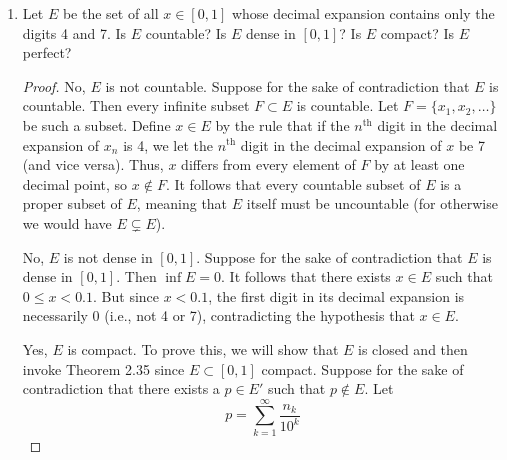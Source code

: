 \documentclass[../psets.tex]{subfiles}
\begin{document}
\begin{enumerate}[label={\textbf{\arabic*.}}]
\begin{proof}
        Define an open cover $\{G_p\}$ of $E$ by
        \begin{equation*}
            G_p = \left( \frac{2(p+1)}{p+2},\frac{3(p+1)}{p+3} \right)
        \end{equation*}
        for each $p\in E$. Clearly each $G_p$ is open as a segment and $p\in G_p$ for each $p\in E$, so $\{G_p\}$ is an open cover of $E$. Now suppose that $\{G_{p_n}\}$ is a finite open cover of $E$. Choose $p=\max p_n$. Then $2<3(p+1)/(p+3)<3$, but $3(p+1)/(p+3)\notin G_{p_n}$ for any $n$, a contradiction. Thus, $G$ is not compact, as desired.\par
        $E$ is open in $\Q$ since for any point $p\in E$, we may choose the segment $G_p\subset E$ containing $p$ and then choose a neighborhood subset of $G_p$.
    \end{proof}
    \item Let $E$ be the set of all $x\in[0,1]$ whose decimal expansion contains only the digits 4 and 7. Is $E$ countable? Is $E$ dense in $[0,1]$? Is $E$ compact? Is $E$ perfect?
    \begin{proof}
        No, $E$ is not countable. Suppose for the sake of contradiction that $E$ is countable. Then every infinite subset $F\subset E$ is countable. Let $F=\{x_1,x_2,\dots\}$ be such a subset. Define $x\in E$ by the rule that if the $n^\text{th}$ digit in the decimal expansion of $x_n$ is 4, we let the $n^\text{th}$ digit in the decimal expansion of $x$ be 7 (and vice versa). Thus, $x$ differs from every element of $F$ by at least one decimal point, so $x\notin F$. It follows that every countable subset of $E$ is a proper subset of $E$, meaning that $E$ itself must be uncountable (for otherwise we would have $E\subsetneq E$).\par
        No, $E$ is not dense in $[0,1]$. Suppose for the sake of contradiction that $E$ is dense in $[0,1]$. Then $\inf E=0$. It follows that there exists $x\in E$ such that $0\leq x<0.1$. But since $x<0.1$, the first digit in its decimal expansion is necessarily 0 (i.e., not 4 or 7), contradicting the hypothesis that $x\in E$.\par
        Yes, $E$ is compact. To prove this, we will show that $E$ is closed and then invoke Theorem 2.35 since $E\subset[0,1]$ compact. Suppose for the sake of contradiction that there exists a $p\in E'$ such that $p\notin E$. Let
        \begin{equation*}
            p = \sum_{k=1}^\infty\frac{n_k}{10^k}
        \end{equation*}

\end{proof}
\end{enumerate}
\end{document}
